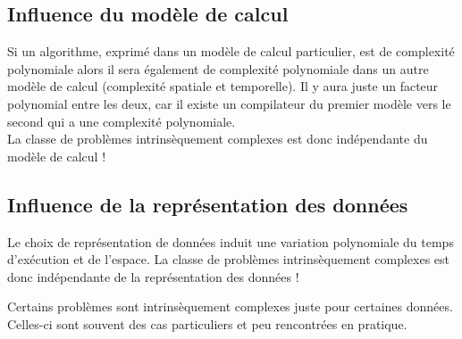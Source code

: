 \subsection{Influence du modèle de calcul}
\label{sub:influence_du_mod_le_de_calcul}
Si un algorithme, exprimé dans un modèle de calcul particulier, est de complexité polynomiale alors il sera
également de complexité polynomiale dans un autre modèle de calcul (complexité spatiale et temporelle). Il y aura juste un facteur
polynomial entre les deux, car il existe un compilateur du premier modèle vers
le second qui a une complexité polynomiale.\\
La classe de problèmes intrinsèquement complexes est donc indépendante du modèle de calcul !

\subsection{Influence de la représentation des données}
\label{sub:influence_de_la_repr_sentation_des_donn_es}
Le choix de représentation de données induit une variation polynomiale du temps
d'exécution et de l'espace. La classe de problèmes intrinsèquement complexes est donc indépendante de la représentation des données !

\begin{myrem}
	Certains problèmes sont intrinsèquement complexes juste pour certaines
	données. Celles-ci sont souvent des cas particuliers et peu
	rencontrées en pratique.
\end{myrem}



